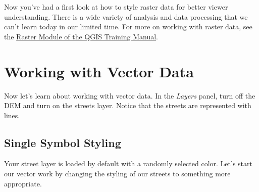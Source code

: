 \documentclass[
]{article}
\begin{document}
Now you've had a first look at how to style raster data for better viewer understanding. There is a wide variety of analysis and data processing that we can't learn today in our limited time. For more on working with raster data, see the \href{https://docs.qgis.org/3.10/en/docs/user_manual/working_with_raster/index.html}{Raster Module of the QGIS Training Manual}.

\hypertarget{working-with-vector-data}{%
\section{Working with Vector Data}\label{working-with-vector-data}}

Now let's learn about working with vector data. In the \emph{Layers} panel, turn off the DEM and turn on the streets layer. Notice that the streets are represented with lines.

\hypertarget{single-symbol-styling}{%
\subsection{Single Symbol Styling}\label{single-symbol-styling}}

Your street layer is loaded by default with a randomly selected color. Let's start our vector work by changing the styling of our streets to something more appropriate.
\end{document}
